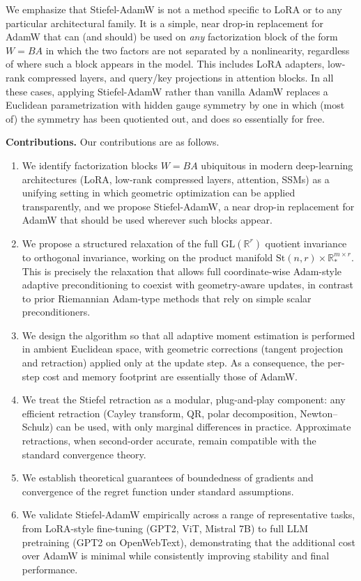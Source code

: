 \documentclass[11pt,a4paper]{article}
\numberwithin{equation}{section}
\newcommand{\algname}{Stiefel-AdamW}
\newcommand{\Stnr}{\mathrm{St}(n,r)}    %
\newcommand{\R}{\mathbb{R}}
\theoremstyle{plain}
\theoremstyle{definition}
\theoremstyle{remark}
\begin{document}
We emphasize that \algname{} is not a method specific to LoRA or to any particular architectural family. It is a simple, near drop-in replacement for AdamW that can (and should) be used on \emph{any} factorization block of the form $W = BA$ in which the two factors are not separated by a nonlinearity, regardless of where such a block appears in the model. This includes LoRA adapters, low-rank compressed layers, and query/key projections in attention blocks.
In all these cases, applying \algname{} rather than vanilla AdamW replaces a Euclidean parametrization with hidden gauge symmetry by one in which (most of) the symmetry has been quotiented out, and does so essentially for free.


\medskip

\textbf{Contributions.} Our contributions are as follows.
\begin{enumerate}
    \item We identify factorization blocks $W = BA$ ubiquitous in modern deep-learning architectures (LoRA, low-rank compressed layers, attention, SSMs) as a unifying setting in which geometric optimization can be applied transparently, and we propose \algname{}, a near drop-in replacement for AdamW that should be used wherever such blocks appear.

    \item We propose a structured relaxation of the full $\mathrm{GL}(\R^r)$ quotient invariance to orthogonal invariance, working on the product manifold $\Stnr \times \R^{m \times r}_*$. This is precisely the relaxation that allows full coordinate-wise Adam-style adaptive preconditioning to coexist with geometry-aware updates, in contrast to prior Riemannian Adam-type methods that rely on simple scalar preconditioners.

    \item We design the algorithm so that all adaptive moment estimation is performed in ambient Euclidean space, with geometric corrections (tangent projection and retraction) applied only at the update step. As a consequence, the per-step cost and memory footprint are essentially those of AdamW.

    \item We treat the Stiefel retraction as a modular, plug-and-play component: any efficient retraction (Cayley transform, QR, polar decomposition, Newton--Schulz) can be used, with only marginal differences in practice. Approximate retractions, when second-order accurate, remain compatible with the standard convergence theory.

    \item We establish theoretical guarantees of boundedness of gradients and convergence of the regret function under standard assumptions.

    \item We validate \algname{} empirically across a range of representative tasks, from LoRA-style fine-tuning (GPT2, ViT, Mistral 7B) to full LLM pretraining (GPT2 on OpenWebText), demonstrating that the additional cost over AdamW is minimal while consistently improving stability and final performance.
\end{enumerate}
\end{document}
